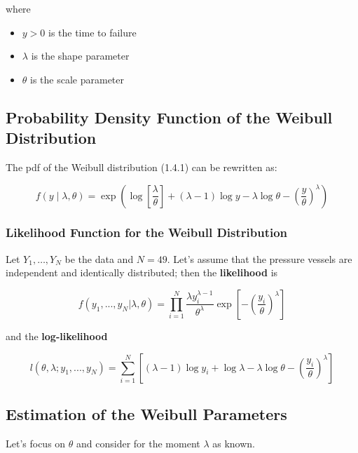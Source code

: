 \documentclass[11pt]{article}
\begin{document}
where
\begin{itemize}
    \item \( y > 0 \) is the time to failure
    \item \( \lambda \) is the shape parameter
    \item \( \theta \) is the scale parameter
\end{itemize}

\subsection{Probability Density Function of the Weibull Distribution}

The pdf of the Weibull distribution (1.4.1) can be rewritten as:

\begin{equation}
    f(y \mid \lambda, \theta) = \exp \left( \log\left[\frac{\lambda}{\theta}\right] + (\lambda - 1) \log y - \lambda \log \theta - \left(\frac{y}{\theta}\right)^\lambda \right)
\end{equation}

\subsubsection{Likelihood Function for the Weibull Distribution}

Let \( Y_1,\dots,Y_N \) be the data and \( N = 49 \). Let's assume that the pressure vessels are independent and identically distributed; then the \textbf{likelihood} is

\begin{equation}
    f(y_1,...,y_N|\lambda, \theta) = \prod_{i=1}^{N} \dfrac{\lambda y_{i}^{\lambda-1}}{\theta^{\lambda}} \exp \left[ - \left( \dfrac{y_i}{\theta} \right)^{\lambda} \right]
\end{equation}

and the \textbf{log-likelihood}

\begin{equation}
    l(\theta, \lambda; y_1,...,y_N) = \sum_{i=1}^{N} \left[ (\lambda - 1) \log y_i + \log \lambda - \lambda \log \theta - \left( \frac{y_i}{\theta} \right)^\lambda \right]
\end{equation}

\subsection{Estimation of the Weibull Parameters}

Let's focus on \(\theta\) and consider for the moment \(\lambda\) as known.
\end{document}
